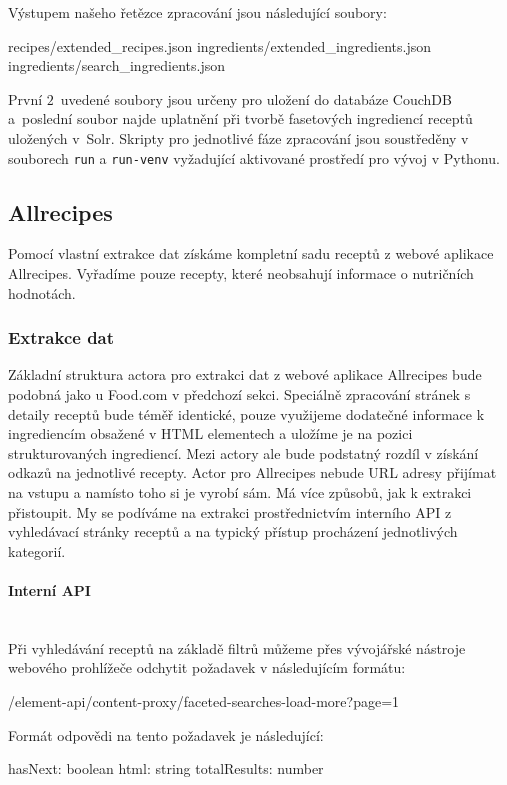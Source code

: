Výstupem našeho řetězce zpracování jsou následující soubory:

\begin{code}
recipes/extended_recipes.json
ingredients/extended_ingredients.json
ingredients/search_ingredients.json
\end{code}

První $2$~uvedené soubory jsou určeny pro uložení do databáze CouchDB a~poslední soubor najde uplatnění při tvorbě fasetových ingrediencí receptů uložených v~Solr. Skripty pro jednotlivé fáze zpracování jsou soustředěny v souborech \texttt{run} a \texttt{run-venv} vyžadující aktivované prostředí pro vývoj v Pythonu.

\subsection{Allrecipes}

Pomocí vlastní extrakce dat získáme kompletní sadu receptů z webové aplikace Allrecipes. Vyřadíme pouze recepty, které neobsahují informace o nutričních hodnotách.

\subsubsection{Extrakce dat}

Základní struktura actora pro extrakci dat z webové aplikace Allrecipes bude podobná jako u Food.com v předchozí sekci. Speciálně zpracování stránek s detaily receptů bude téměř identické, pouze využijeme dodatečné informace k ingrediencím obsažené v HTML elementech a uložíme je na pozici strukturovaných ingrediencí. Mezi actory ale bude podstatný rozdíl v získání odkazů na jednotlivé recepty. Actor pro Allrecipes nebude URL adresy přijímat na vstupu a namísto toho si je vyrobí sám. Má více způsobů, jak k extrakci přistoupit. My se podíváme na extrakci prostřednictvím interního API z vyhledávací stránky receptů a na typický přístup procházení jednotlivých kategorií.

\paragraph{Interní API}\mbox{}\\

Při vyhledávání receptů na základě filtrů můžeme přes vývojářské nástroje webového prohlížeče odchytit požadavek v následujícím formátu:

\begin{code}
/element-api/content-proxy/faceted-searches-load-more?page=1
\end{code}
Formát odpovědi na tento požadavek je následující:
\begin{code}
{
    hasNext: boolean
    html: string
    totalResults: number
}
\end{code}

